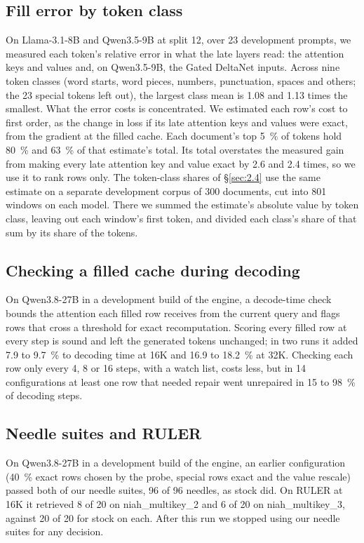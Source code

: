 \documentclass[11pt]{article}
\begin{document}
\subsection{Fill error by token class}\label{sec:I.3}
On Llama-3.1-8B and Qwen3.5-9B at split 12, over 23 development prompts, we measured each token's relative error in what the late layers read: the attention keys and values and, on Qwen3.5-9B, the Gated DeltaNet inputs. Across nine token classes (word starts, word pieces, numbers, punctuation, spaces and others; the 23 special tokens left out), the largest class mean is 1.08 and 1.13 times the smallest. What the error costs is concentrated. We estimated each row's cost to first order, as the change in loss if its late attention keys and values were exact, from the gradient at the filled cache. Each document's top 5~\% of tokens hold 80~\% and 63~\% of that estimate's total. Its total overstates the measured gain from making every late attention key and value exact by 2.6 and 2.4 times, so we use it to rank rows only. The token-class shares of \S\ref{sec:2.4} use the same estimate on a separate development corpus of 300 documents, cut into 801 windows on each model. There we summed the estimate's absolute value by token class, leaving out each window's first token, and divided each class's share of that sum by its share of the tokens.


\subsection{Checking a filled cache during decoding}\label{sec:I.4}
On Qwen3.8-27B in a development build of the engine, a decode-time check bounds the attention each filled row receives from the current query and flags rows that cross a threshold for exact recomputation. Scoring every filled row at every step is sound and left the generated tokens unchanged; in two runs it added 7.9 to 9.7~\% to decoding time at 16K and 16.9 to 18.2~\% at 32K. Checking each row only every 4, 8 or 16 steps, with a watch list, costs less, but in 14 configurations at least one row that needed repair went unrepaired in 15 to 98~\% of decoding steps.


\subsection{Needle suites and RULER}\label{sec:I.5}
On Qwen3.8-27B in a development build of the engine, an earlier configuration (40~\% exact rows chosen by the probe, special rows exact and the value rescale) passed both of our needle suites, 96 of 96 needles, as stock did. On RULER at 16K it retrieved 8 of 20 on niah\_multikey\_2 and 6 of 20 on niah\_multikey\_3, against 20 of 20 for stock on each. After this run we stopped using our needle suites for any decision.
\end{document}
